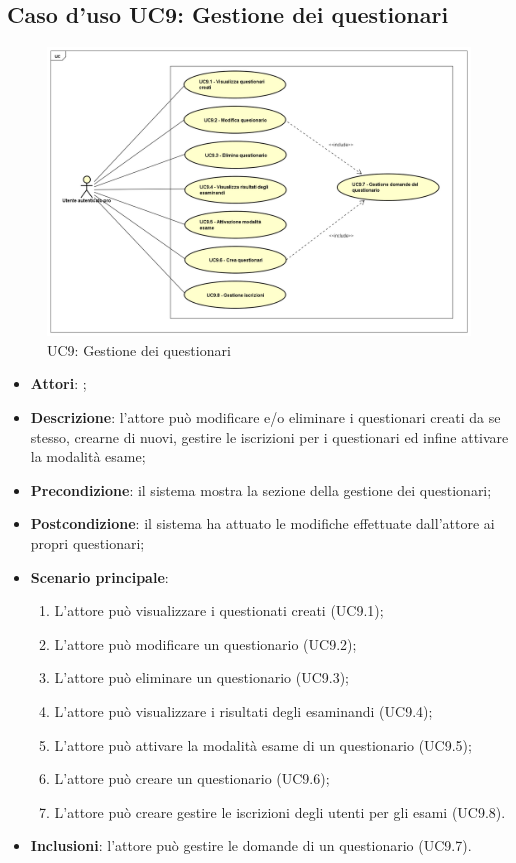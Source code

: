 \newpage
\subsection{Caso d'uso UC9: Gestione dei questionari}
\label{UC9}
\begin{figure}[h]
	\centering
	\includegraphics[scale=0.445,keepaspectratio]{UML/UC9.png}
	\caption{UC9: Gestione dei questionari}
\end{figure}
\FloatBarrier
\begin{itemize}
	\item \textbf{Attori}: \uaupro{};
	\item \textbf{Descrizione}: l'attore può modificare e/o eliminare i questionari creati da se stesso, crearne di nuovi, gestire le iscrizioni per i questionari ed infine attivare la modalità esame; 
	\item \textbf{Precondizione}: il sistema mostra la sezione della gestione dei questionari;
	\item \textbf{Postcondizione}: il sistema ha attuato le modifiche effettuate dall'attore ai propri questionari;
	\item \textbf{Scenario principale}:
		\begin{enumerate}
			\item L'attore può visualizzare i questionati creati (UC9.1);
			\item L'attore può modificare un questionario (UC9.2);
			\item L'attore può eliminare un questionario (UC9.3);
			\item L'attore può visualizzare i risultati degli esaminandi (UC9.4);
			\item L'attore può attivare la modalità esame di un questionario (UC9.5);
			\item L'attore può creare un questionario (UC9.6);
			\item L'attore può creare gestire le iscrizioni degli utenti per gli esami (UC9.8).
		\end{enumerate}
		\item \textbf{Inclusioni}: l'attore può gestire le domande di un questionario (UC9.7).		
\end{itemize}
							
